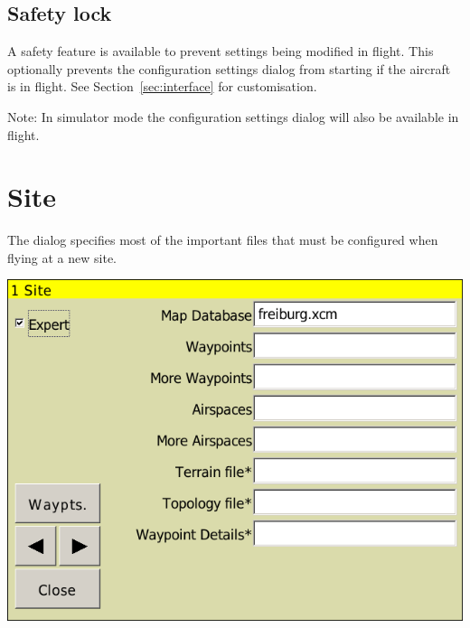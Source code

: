 \subsection*{Safety lock}

A safety feature is available to prevent settings being modified in
flight.  This optionally prevents the configuration settings dialog
from starting if the aircraft is in flight. See Section~\ref{sec:interface} for customisation.

Note: In simulator mode the configuration settings dialog will also be available in flight.



\clearpage
\section{Site}
The dialog specifies most of the important files that must be
configured when flying at a new site.

\begin{center}
\includegraphics[angle=0,width=0.8\linewidth,keepaspectratio='true']{figures/config-site.png}
\end{center}

